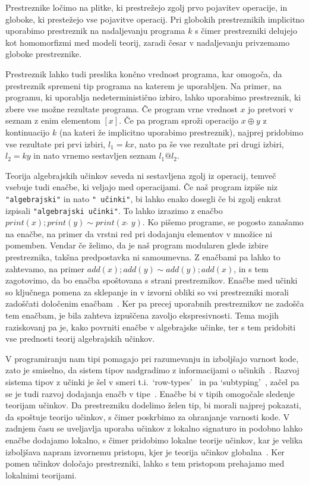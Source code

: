 \documentclass{article}
\begin{document}
Prestreznike ločimo na plitke, ki prestrežejo zgolj prvo pojavitev operacije, in globoke, ki prestežejo vse pojavitve operacij. Pri globokih prestreznikih implicitno uporabimo prestreznik na nadaljevanju programa $k$ s čimer prestrezniki delujejo kot homomorfizmi med modeli teorij, zaradi česar v nadaljevanju privzemamo globoke prestreznike.

Prestreznik lahko tudi preslika končno vrednost programa, kar omogoča, da prestreznik spremeni tip programa na katerem je uporabljen. Na primer, na programu, ki uporablja nedeterministično izbiro, lahko uporabimo prestreznik, ki zbere vse možne rezultate programa. Če program vrne vrednost $x$ jo pretvori v seznam z enim elementom $[x]$. Če pa program sproži operacijo $x \oplus y$ z kontinuacijo $k$ (na kateri že implicitno uporabimo prestreznik), najprej pridobimo vse rezultate pri prvi izbiri, $l_1 = k x$, nato pa še vse rezultate pri drugi izbiri, $l_2 = k y$ in nato vrnemo sestavljen seznam $l_1 @ l_2$. 

Teorija algebrajskih učinkov seveda ni sestavljena zgolj iz operacij, temveč vsebuje tudi enačbe, ki veljajo med operacijami. Če naš program izpiše niz \texttt{"algebrajski"} in nato \texttt{" učinki"}, bi lahko enako dosegli če bi zgolj enkrat izpisali \texttt{"algebrajski učinki"}. To lahko izrazimo z enačbo $print(x); print(y) \sim print(x\;\hat{}\;y)$. Ko pišemo programe, se pogosto zanašamo na enačbe, na primer da vrstni red pri dodajanju elementov v množice ni pomemben. Vendar če želimo, da je naš program modularen glede izbire prestreznika, takšna predpostavka ni samoumevna. Z enačbami pa lahko to zahtevamo, na primer $add(x); add(y) \sim add(y); add(x)$, in s tem zagotovimo, da bo enačba spoštovana s strani prestreznikov. Enačbe med učinki so ključnega pomena za sklepanje in v izvorni obliki so vsi prestrezniki morali zadoščati določenim enačbam~\cite{DBLP:conf/esop/PlotkinP09}. Ker pa precej uporabnih prestreznikov ne zadošča tem enačbam, je bila zahteva izpuščena zavoljo ekspresivnosti. Tema mojih raziskovanj pa je, kako povrniti enačbe v algebrajske učinke, ter s tem pridobiti vse prednosti teorij algebrajskih učinkov.

V programiranju nam tipi pomagajo pri razumevanju in izboljšajo varnost kode, zato je smiselno, da sistem tipov nadgradimo z informacijami o učinkih~\cite{DBLP:conf/esop/PlotkinP09}. Razvoj sistema tipov z učinki je šel v smeri t.i.\ `row-types'~\cite{DBLP:conf/icfp/HillerstromL16} in pa `subtyping'~\cite{DBLP:conf/esop/SalehKPS18}, začel pa se je tudi razvoj dodajanja enačb v tipe~\cite{DBLP:journals/pacmpl/Ahman18}. Enačbe bi v tipih omogočale sledenje teorijam učinkov. Da prestrezniku dodelimo želen tip, bi morali najprej pokazati, da spoštuje teorijo učinkov, s čimer poskrbimo za ohranjanje varnosti kode. V zadnjem času se uveljavlja uporaba učinkov z lokalno signaturo in podobno lahko enačbe dodajamo lokalno, s čimer pridobimo lokalne teorije učinkov, kar je velika izboljšava napram izvornemu pristopu, kjer je teorija učinkov globalna~\cite{DBLP:conf/esop/PlotkinP09}. Ker pomen učinkov določajo prestrezniki, lahko s tem pristopom prehajamo med lokalnimi teorijami.
\end{document}
